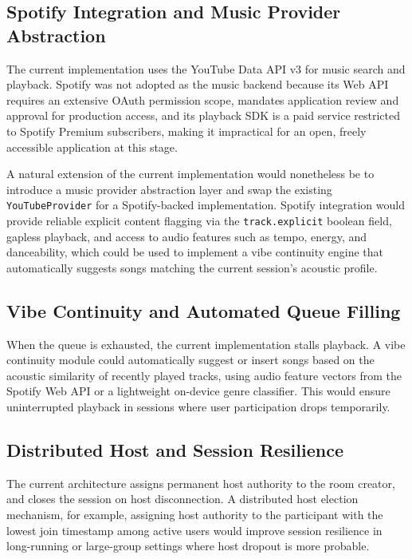 \documentclass[pdflatex,sn-mathphys-num,iicol]{sn-jnl}
\theoremstyle{thmstyleone}%
\theoremstyle{thmstyletwo}%
\theoremstyle{thmstylethree}%
\begin{document}
\subsection{Spotify Integration and Music Provider Abstraction}

The current implementation uses the YouTube Data API v3 for music search and playback.
Spotify was not adopted as the music backend because its Web API requires an extensive
OAuth permission scope, mandates application review and approval for production access,
and its playback SDK is a paid service restricted to Spotify Premium subscribers,
making it impractical for an open, freely accessible application at this stage.

A natural extension of the current implementation would nonetheless be to introduce a
music provider abstraction layer and swap the existing \texttt{YouTubeProvider} for a
Spotify-backed implementation. Spotify integration would provide reliable explicit
content flagging via the \texttt{track.explicit} boolean field, gapless playback, and
access to audio features such as tempo, energy, and danceability, which could be used
to implement a vibe continuity engine that automatically suggests songs matching the
current session's acoustic profile.

\subsection{Vibe Continuity and Automated Queue Filling}

When the queue is exhausted, the current implementation stalls playback. A vibe
continuity module could automatically suggest or insert songs based on the acoustic
similarity of recently played tracks, using audio feature vectors from the Spotify
Web API or a lightweight on-device genre classifier. This would ensure uninterrupted
playback in sessions where user participation drops temporarily.

\subsection{Distributed Host and Session Resilience}

The current architecture assigns permanent host authority to the room creator, and
closes the session on host disconnection. A distributed host election mechanism,
for example, assigning host authority to the participant with the lowest join
timestamp among active users would improve session resilience in long-running or
large-group settings where host dropout is more probable.
\end{document}
